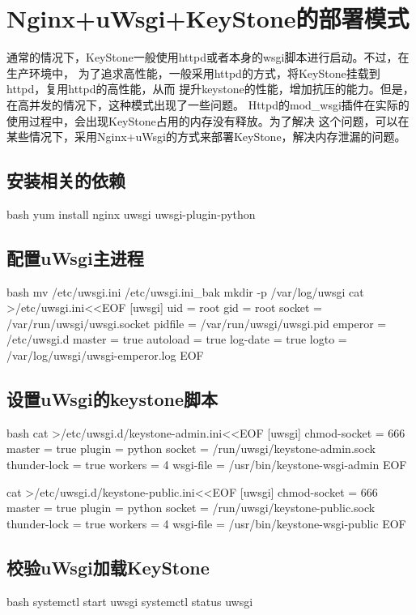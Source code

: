 \chapter{Nginx+uWsgi+KeyStone的部署模式}

通常的情况下，KeyStone一般使用httpd或者本身的wsgi脚本进行启动。不过，在生产环境中，
为了追求高性能，一般采用httpd的方式，将KeyStone挂载到httpd，复用httpd的高性能，从而
提升keystone的性能，增加抗压的能力。但是，在高并发的情况下，这种模式出现了一些问题。
Httpd的mod\_wsgi插件在实际的使用过程中，会出现KeyStone占用的内存没有释放。为了解决
这个问题，可以在某些情况下，采用Nginx+uWsgi的方式来部署KeyStone，解决内存泄漏的问题。

\section{安装相关的依赖}
\begin{code-block}{bash}
yum install nginx uwsgi uwsgi-plugin-python
\end{code-block}

\section{配置uWsgi主进程}
\begin{code-block}{bash}
mv /etc/uwsgi.ini /etc/uwsgi.ini_bak
mkdir -p /var/log/uwsgi
cat >/etc/uwsgi.ini<<EOF
[uwsgi]
uid = root
gid = root
socket = /var/run/uwsgi/uwsgi.socket
pidfile = /var/run/uwsgi/uwsgi.pid
emperor = /etc/uwsgi.d
master = true
autoload = true
log-date = true
logto = /var/log/uwsgi/uwsgi-emperor.log
EOF
\end{code-block}

\section{设置uWsgi的keystone脚本}
\begin{code-block}{bash}
cat >/etc/uwsgi.d/keystone-admin.ini<<EOF
[uwsgi]
chmod-socket = 666
master = true
plugin = python
socket = /run/uwsgi/keystone-admin.sock
thunder-lock = true
workers = 4
wsgi-file = /usr/bin/keystone-wsgi-admin
EOF

cat >/etc/uwsgi.d/keystone-public.ini<<EOF
[uwsgi]
chmod-socket = 666
master = true
plugin = python
socket = /run/uwsgi/keystone-public.sock
thunder-lock = true
workers = 4
wsgi-file = /usr/bin/keystone-wsgi-public
EOF
\end{code-block}

\section{校验uWsgi加载KeyStone}
\begin{code-block}{bash}
systemctl start uwsgi
systemctl status uwsgi
\end{code-block}

